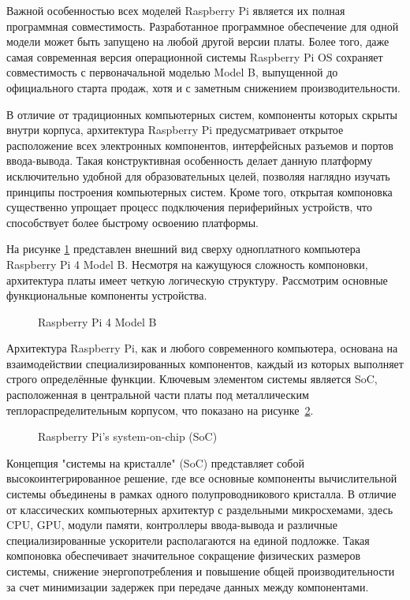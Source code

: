 Важной особенностью всех моделей Raspberry Pi является их полная программная совместимость. Разработанное программное обеспечение для одной модели может быть запущено на любой другой версии платы. Более того, даже самая современная версия операционной системы Raspberry Pi OS сохраняет совместимость с первоначальной моделью Model B, выпущенной до официального старта продаж, хотя и с заметным снижением производительности.

В отличие от традиционных компьютерных систем, компоненты которых скрыты внутри корпуса, архитектура Raspberry Pi предусматривает открытое расположение всех электронных компонентов, интерфейсных разъемов и портов ввода-вывода. Такая конструктивная особенность делает данную платформу исключительно удобной для образовательных целей, позволяя наглядно изучать принципы построения компьютерных систем. Кроме того, открытая компоновка существенно упрощает процесс подключения периферийных устройств, что способствует более быстрому освоению платформы.

На рисунке \ref{fig:raspberry4B} представлен внешний вид сверху одноплатного компьютера Raspberry Pi 4 Model B. Несмотря на кажущуюся сложность компоновки, архитектура платы имеет четкую логическую структуру. Рассмотрим основные функциональные компоненты устройства.

\begin{figure}[H]
	\centering
	\caption{Raspberry Pi 4 Model B}
	\label{fig:raspberry4B}
\end{figure}

Архитектура Raspberry Pi, как и любого современного компьютера, основана на взаимодействии специализированных компонентов, каждый из которых выполняет строго определённые функции. Ключевым элементом системы является SoC, расположенная в центральной части платы под металлическим теплораспределительным корпусом, что показано на рисунке~\ref{fig:soc}. 

\begin{figure}[H]
	\centering
	\caption{Raspberry Pi’s system-on-chip (SoC)}
	\label{fig:soc}
\end{figure}

Концепция "системы на кристалле" (SoC) представляет собой высокоинтегрированное решение, где все основные компоненты вычислительной системы объединены в рамках одного полупроводникового кристалла. В отличие от классических компьютерных архитектур с раздельными микросхемами, здесь CPU,  GPU, модули памяти, контроллеры ввода-вывода и различные специализированные ускорители располагаются на единой подложке. Такая компоновка обеспечивает значительное сокращение физических размеров системы, снижение энергопотребления и повышение общей производительности за счет минимизации задержек при передаче данных между компонентами.

